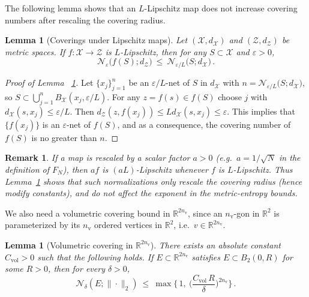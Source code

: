\documentclass{article}
\newcommand{\R}{\mathbb{R}}
\newtheorem{lemma}[theorem]{Lemma}
\newtheorem{remark}{Remark}[section]
\begin{document}
The following lemma shows that an \(L\)-Lipschitz map does not increase covering numbers after rescaling
the covering radius.

\begin{lemma}[Coverings under Lipschitz maps]\label{lem:cover-lip}
Let $(\mathcal X,d_{\mathcal X})$ and $(\mathcal Z,d_{\mathcal{Z}})$ be metric spaces.
If $f:\mathcal X\to\mathcal Z$ is $L$-Lipschitz, then for any $S\subset\mathcal X$ and $\varepsilon>0$,
\[
\mathcal{N}_\varepsilon\!\bigl(f(S);d_{\mathcal{Z}}\bigr)\ \le\ \mathcal{N}_{\varepsilon/L}\!\bigl(S;d_{\mathcal X}\bigr)\,.
\]
\end{lemma}

\begin{proof}[Proof of Lemma ~\ref{lem:cover-lip}]
Let $\{x_j\}_{j=1}^n$ be an $\varepsilon/L$-net of $S$ in $d_{\mathcal X}$ with
$n=\mathcal{N}_{\varepsilon/L}\!\bigl(S;d_{\mathcal X}\bigr)$, so
$S\subset\bigcup_{j=1}^n B_{\mathcal X}(x_j,\varepsilon/L)$.
For any $z=f(s)\in f(S)$ choose $j$ with $d_{\mathcal X}(s,x_j)\le\varepsilon/L$.
Then $d_{\mathcal{Z}}(z,f(x_j))\le L d_{\mathcal X}(s,x_j)\le\varepsilon$.
This implies that $\{f(x_j)\}$ is an $\varepsilon$-net of $f(S)$, and as a consequence,
the covering number of $f(S)$ is no greater than $n$.
\end{proof}

\begin{remark}
If a map is rescaled by a scalar factor $a>0$ (e.g.\ $a=1/\sqrt{N}$ in the definition of $F_N$),
then $a f$ is $(aL)$-Lipschitz whenever $f$ is $L$-Lipschitz. Thus Lemma~\ref{lem:cover-lip}
shows that such normalizations only rescale the covering radius (hence modify constants), and do not
affect the exponent in the metric-entropy bounds.
\end{remark}

We also need a volumetric covering bound in $\R^{2n_{\mathrm v}}$, since an $n_{\mathrm v}$-gon in $\R^2$
is parameterized by its $n_{\mathrm v}$ ordered vertices in $\R^2$, i.e.\ $v\in\R^{2n_{\mathrm v}}$.

\begin{lemma}[Volumetric covering in $\R^{2n_{\mathrm v}}$]\label{lem:volumetric}
There exists an absolute constant $C_{\mathrm{vol}}>0$ such that the following holds.
If $E\subset\R^{2n_{\mathrm v}}$ satisfies $E\subset B_2(0,R)$ for some $R>0$, then for every $\delta>0$,
\[
\mathcal{N}_\delta(E;\|\cdot\|_2)\ \le\ \max\Big\{\,1,\ \Big(\frac{C_{\mathrm{vol}}\,R}{\delta}\Big)^{2n_{\mathrm v}}\Big\}\,.
\]
\end{lemma}
\end{document}
